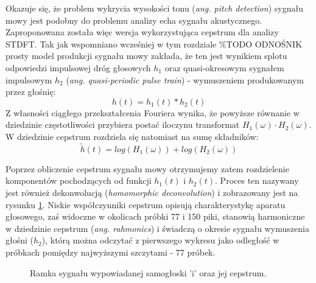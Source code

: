 Okazuje się, że problem wykrycia wysokości tonu (\textit{ang. pitch detection}) sygnału mowy jest podobny do problemu analizy echa sygnału akustycznego. Zaproponowana została więc wersja wykorzystująca cepstrum dla analizy STDFT\cite{noll}. Tak jak wspomniano wcześniej w tym rozdziale \%TODO ODNOŚNIK prosty model produkcji sygnału mowy zakłada, że ten jest wynikiem splotu odpowiedzi impulsowej dróg głosowych $h_1$ oraz quasi-okresowym sygnałem impulsowym $h_2$ (\textit{ang. quasi-periodic pulse train}) - wymuszeniem produkowanym przez głośnię:
\begin{equation}
    h(t) = h_1(t)*h_2(t)
\end{equation}
Z własności ciągłego przekształcenia Fouriera wynika, że powyższe równanie w dziedzinie częstotliwości przybiera postać iloczynu transformat $H_1(\omega) \cdot H_2(\omega)$. W dziedzinie cepstrum rozdziela się natomiast na sumę składników:
\begin{equation}
    \tilde{h}(t) = log(H_1(\omega)) + log(H_2(\omega))
\end{equation}

Poprzez obliczenie cepstrum sygnału mowy otrzymujemy zatem rozdzielenie komponentów pochodzących od funkcji $h_1(t)$ i $h_2(t)$. Proces ten nazywany jest również dekonwolucją (\textit{homomorphic deconvolution})\cite{hdsp} i  zobrazowany jest na rysunku \ref{fig:e_cepstrum}. Niskie współczynniki cepstrum opisują charakterystykę aparatu głosowego, zaś widoczne w okolicach próbki 77 i 150 piki, stanowią harmoniczne w dziedzinie cepstrum (\textit{ang. rahmonics}) i świadczą o okresie sygnału wymuszenia głośni ($h_2$), którą można odczytać z pierwszego wykresu jako odległość w próbkach pomiędzy najwyższymi szczytami - 77 próbek.

\begin{figure}
  \centering
  \begin{minipage}{.5\textwidth}
    \centering
    
  \end{minipage}%
  \begin{minipage}{.5\textwidth}
    \centering
    
  \end{minipage}
  \caption{Ramka sygnału wypowiadanej samogłoski 'i' oraz jej cepstrum.}
  \label{fig:e_cepstrum}
\end{figure}

